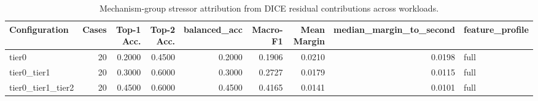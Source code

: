 \begin{table}[t]
\centering
\caption{Mechanism-group stressor attribution from DICE residual contributions across workloads.}
\label{tab:dice_stressor_diagnosis}
\footnotesize
\begin{tabular}{lrrrrrrrl}
\toprule
Configuration & Cases & Top-1 Acc. & Top-2 Acc. & balanced_acc & Macro-F1 & Mean Margin & median_margin_to_second & feature_profile \\
\midrule
tier0 & 20 & 0.2000 & 0.4500 & 0.2000 & 0.1906 & 0.0210 & 0.0198 & full \\
tier0_tier1 & 20 & 0.3000 & 0.6000 & 0.3000 & 0.2727 & 0.0179 & 0.0115 & full \\
tier0_tier1_tier2 & 20 & 0.4500 & 0.6000 & 0.4500 & 0.4165 & 0.0141 & 0.0101 & full \\
\bottomrule
\end{tabular}

\end{table}

